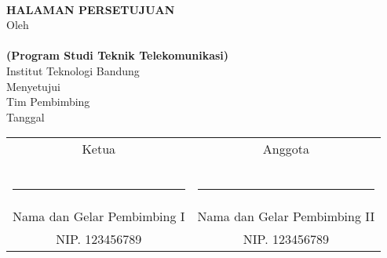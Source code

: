 \clearpage

\begin{center}    
	\renewcommand{\baselinestretch}{1}
    \large{\bfseries \MakeUppercase{\thetitle}}
    \\[2\baselineskip]

\large{\bfseries HALAMAN PERSETUJUAN}
    \\[\baselineskip]

    \normalsize{Oleh\\
    	\textbf{\theauthor}\\
    	\textbf{(Program Studi Teknik Telekomunikasi)}
    	\\[\baselineskip]
    	Institut Teknologi Bandung}
    \\[3\baselineskip]
    
    
    \normalsize{Menyetujui\\
    	Tim Pembimbing
    	\\[\baselineskip]
    	Tanggal \thedate}
    \\[5\baselineskip]
    
    \normalsize{%
    \setlength{\tabcolsep}{12pt}
    \begin{tabular}{c@{\hskip 0.5in}c}
        Ketua & Anggota \\
        & \\
        & \\
        & \\
        \rule{5cm}{0.4pt} & \rule{5cm}{0.4pt} \\
        Nama dan Gelar Pembimbing I & Nama dan Gelar Pembimbing II \\
        NIP. 123456789 & NIP. 123456789 \\
    \end{tabular}
    }

\end{center}
\clearpage
